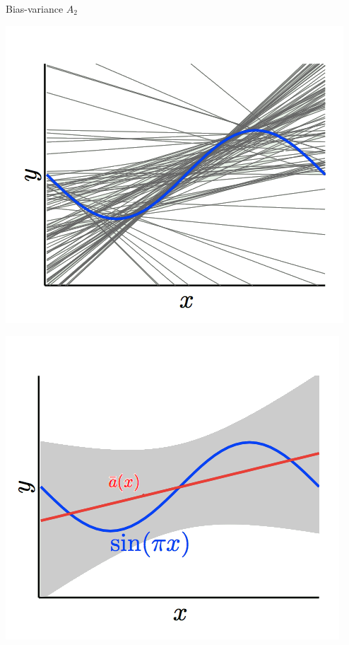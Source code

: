 \documentclass[10pt]{beamer}
\begin{document}
\begin{frame}{Bias-variance $A_2$}
  \centering
  \begin{minipage}[b]{.45\textwidth}
    \includegraphics[width=\textwidth, keepaspectratio]{images/sin4} 
  \end{minipage}\qquad
  \pause
  \begin{minipage}[b]{.45\textwidth}
    \includegraphics[width=\textwidth, keepaspectratio]{images/sin41}
  \end{minipage}
\end{frame}
\end{document}
